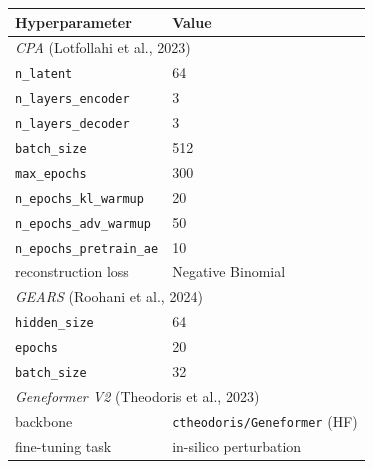 \documentclass{article}
\begin{document}
\begin{table}[h]
\centering
\small
\begin{tabular}{ll}
\toprule
\textbf{Hyperparameter} & \textbf{Value} \\
\midrule
\multicolumn{2}{l}{\textit{CPA} (Lotfollahi et al., 2023)} \\
\hspace{1em}\texttt{n\_latent}                            & 64 \\
\hspace{1em}\texttt{n\_layers\_encoder}                   & 3 \\
\hspace{1em}\texttt{n\_layers\_decoder}                   & 3 \\
\hspace{1em}\texttt{batch\_size}                          & 512 \\
\hspace{1em}\texttt{max\_epochs}                          & 300 \\
\hspace{1em}\texttt{n\_epochs\_kl\_warmup}                & 20 \\
\hspace{1em}\texttt{n\_epochs\_adv\_warmup}               & 50 \\
\hspace{1em}\texttt{n\_epochs\_pretrain\_ae}              & 10 \\
\hspace{1em}reconstruction loss                           & Negative Binomial \\
\midrule
\multicolumn{2}{l}{\textit{GEARS} (Roohani et al., 2024)} \\
\hspace{1em}\texttt{hidden\_size}                          & 64 \\
\hspace{1em}\texttt{epochs}                                & 20 \\
\hspace{1em}\texttt{batch\_size}                           & 32 \\
\midrule
\multicolumn{2}{l}{\textit{Geneformer V2} (Theodoris et al., 2023)} \\
\hspace{1em}backbone                                       & \texttt{ctheodoris/Geneformer} (HF) \\
\hspace{1em}fine-tuning task                               & in-silico perturbation \\

\end{tabular}
\end{table}
\end{document}
